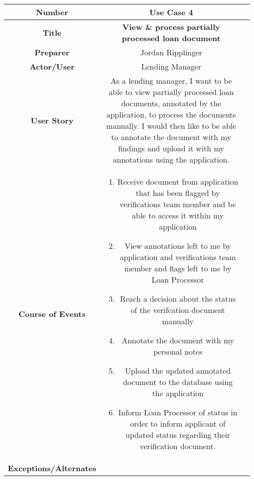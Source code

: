 \begin{table}[H]
    \centering
    \begin{tabularx}{0.75\linewidth}{||Sc|X||}
        \hline
        \hline
        \textbf{Number} & \textbf{Use Case 4} \\
        \hline
        \textbf{Title} & \textbf{View \& process partially processed loan document} \\
        \hline
        \textbf{Preparer} & Jordan Ripplinger \\
        \hline
        \textbf{Actor/User} & Lending Manager \\
        \hline
        \textbf{User Story} &
        As a lending manager, I want to be able to view partially processed loan documents, annotated by the application, to process the documents manually. I would then like to be able to annotate the document with my findings and upload it with my annotations using the application. \\
        \hline
        \textbf{Course of Events} &
        \begin{minipage}[l]{\linewidth}
            \begin{enumerate}[wide, labelindent=0pt]
                \item Receive document from application that has been flagged by verifications team member and be able to access it within my application
                \item View annotations left to me by application and verifications team member and flags left to me by Loan Processor
                \item Reach a decision about the status of the verifcation document manually
                \item Annotate the document with my personal notes
                \item Upload the updated annotated document to the database using the application
                \item Inform Loan Processor of status in order to inform applicant of updated status regarding their verification document.
            \end{enumerate}
            \vspace{4pt}
        \end{minipage} \\
        \hline
        \textbf{Exceptions/Alternates} & 
        \begin{minipage}[l]{\linewidth}
            \vspace{2pt}
            \begin{itemize}[wide, labelindent=0pt]

\end{itemize}
\end{minipage}
\end{tabularx}
\end{table}
